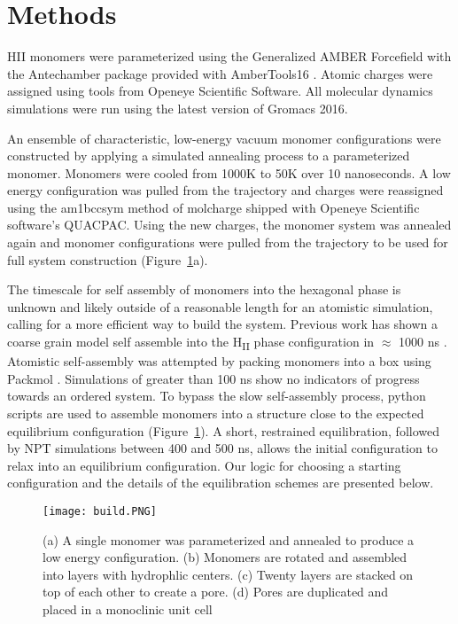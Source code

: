 \section*{Methods}
	
HII monomers were parameterized using the Generalized AMBER Forcefield
\cite{wang_development_2004} with the Antechamber package \cite{wang_automatic_2006}
provided with AmberTools16 \cite{case_ambertools16_2016}. Atomic charges were
assigned using tools from Openeye Scientific Software. All molecular 
dynamics simulations were run using the latest version of Gromacs 2016. \cite{bekker_gromacs:_1993,berendsen_gromacs:_1995,
van_der_spoel_gromacs:_2005,hess_gromacs_2008}
	
An ensemble of characteristic, low-energy vacuum monomer configurations
were constructed by applying a simulated annealing process to a
parameterized monomer. Monomers were cooled from 1000K to 50K over 10
nanoseconds. A low energy configuration was pulled from the trajectory 
and charges were reassigned using the am1bccsym method of molcharge
shipped with Openeye Scientific software's QUACPAC. Using the new
charges, the monomer system was annealed again and monomer
configurations were pulled from the trajectory to be used for full
system construction (Figure~\ref{fig:python}a).
	
The timescale for self assembly of monomers into the hexagonal phase is
unknown and likely outside of a reasonable length for an atomistic
simulation, calling for a more efficient way to build the system. 
Previous work has shown a coarse grain model self assemble into the H\textsubscript{II}
phase configuration in $\approx$ 1000 ns \cite{mondal_self-assembly_2013}.
Atomistic self-assembly was attempted by packing monomers into a box 
using Packmol \cite{martinez_packmol:_2009}. Simulations of greater than 100 ns 
show no indicators of progress towards an ordered system. To bypass the
slow self-assembly process, python scripts are used to assemble 
monomers into a structure close to the expected equilibrium configuration (Figure~\ref{fig:python}).
A short, restrained equilibration, followed by NPT simulations between 400 and 500 ns, 
allows the initial configuration to relax into an equilibrium configuration.
Our logic for choosing a starting configuration and the details of the equilibration 
schemes are presented below. %

\begin{figure}[H]
	\centering
	\texttt{[image: build.PNG]}
	\caption{(a) A single monomer was parameterized and annealed to produce a low energy
		configuration. (b) Monomers are rotated and assembled into layers with 
		hydrophlic centers. (c) Twenty layers are stacked on top of each other to create
		a pore. (d) Pores are duplicated and placed in a monoclinic unit cell}\label{fig:python}
\end{figure}


